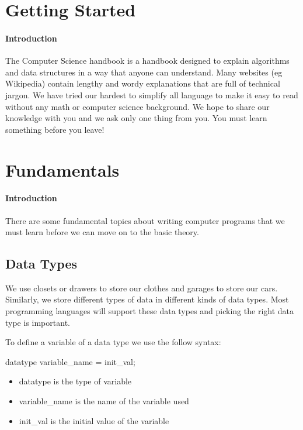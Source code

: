 \documentclass[11pt,oneside]{book}
\begin{document}
\chapter{Getting Started}\subsubsection{Introduction}

The Computer Science handbook is a handbook designed to explain algorithms and data structures in a way that anyone can understand. Many websites (eg Wikipedia) contain lengthy and wordy explanations that are full of technical jargon. We have tried our hardest to simplify all language to make it easy to read without any math or computer science background. We hope to share our knowledge with you and we ask only one thing from you. You must learn something before you leave!

\chapter{Fundamentals}\subsubsection{Introduction}

There are some fundamental topics about writing computer programs that we must learn before we can move on to the basic theory.

\section{Data Types}

We use closets or drawers to store our clothes and garages to store our cars. Similarly, we store different types of data in different kinds of data types. Most programming languages will support these data types and picking the right data type is important.

To define a variable of a data type we use the follow syntax:

datatype variable\_name = init\_val;

\begin{itemize}
\item datatype is the type of variable
\item variable\_name is the name of the variable used
\item init\_val is the initial value of the variable
\end{itemize}
\end{document}
